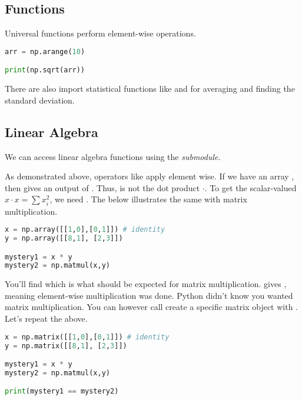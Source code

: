 \subsection{Functions}%

Universal functions perform element-wise operations. 

\begin{lstlisting}[language = Python]
arr = np.arange(10)

print(np.sqrt(arr))
\end{lstlisting}

There are also import statistical functions like  and  for averaging and finding the standard deviation. 

\subsection{Linear Algebra}%

We can access linear algebra functions using the  \emph{submodule}.


\smallskip
\noindent As demonstrated above, operators like \code{*} apply element wise. If we have an array , then  gives an output of . Thus, \code{*} is not the dot product $\cdot$. To get the scalar-valued  $x\cdot x = \sum x_i ^2$, we need . The below illustrates the same with matrix multiplication.

\begin{lstlisting}[language = Python]
x = np.array([[1,0],[0,1]]) # identity
y = np.array([[8,1], [2,3]])

mystery1 = x * y
mystery2 = np.matmul(x,y)
\end{lstlisting}

\noindent You'll find  which is what should be expected for matrix multiplication.  gives , meaning element-wise multiplication was done. Python didn't know you wanted matrix multiplication. You can however call create a specific matrix object with . Let's repeat the above. 


\begin{lstlisting}[language = Python]
x = np.matrix([[1,0],[0,1]]) # identity
y = np.matrix([[8,1], [2,3]])

mystery1 = x * y
mystery2 = np.matmul(x,y)

print(mystery1 == mystery2)
\end{lstlisting}


